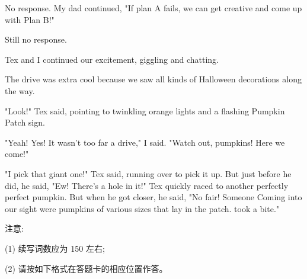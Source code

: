 \documentclass{英语试卷}
\begin{document}
\par No response. My dad continued, "If plan A fails, we can get creative and come up with Plan B!"\par
\par Still no response.\par
\par Tex and I continued our excitement, giggling and chatting.\par
\par The drive was extra cool because we saw all kinds of Halloween decorations along the way.\par
\par "Look!" Tex said, pointing to twinkling orange lights and a flashing Pumpkin Patch sign.\par
\par "Yeah! Yes! It wasn't too far a drive," I said. "Watch out, pumpkins! Here we come!"\par
\par "I pick that giant one!" Tex said, running over to pick it up. But just before he did, he said, "Ew! There's a hole in it!" Tex quickly raced to another perfectly perfect pumpkin. But when he got closer, he said, "No fair! Someone Coming into our sight were pumpkins of various sizes that lay in the patch. took a bite."\par
\par 注意:\par
\par (1) 续写词数应为 150 左右;\par
\par (2) 请按如下格式在答题卡的相应位置作答。\par
{}
\end{document}
